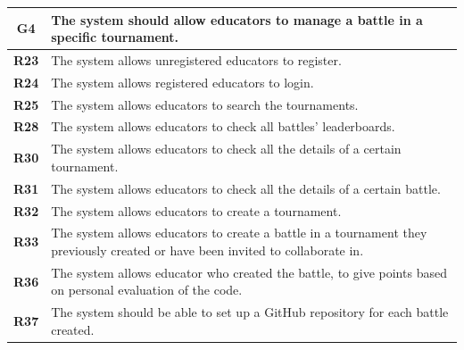 \documentclass[12pt, a4paper]{report}
\begin{document}
    \begin{table}[H]
        \begin{tabularx}{\textwidth}{cX}
        \textbf{G4}  & The system should allow educators to manage a battle in a specific tournament.                                                   \\ \hline
        \textbf{R23} & The system allows unregistered educators to register.                                                                            \\
        \textbf{R24} & The system allows registered educators to login.                                                                                 \\
        \textbf{R25} & The system allows educators to search the tournaments.                                                                           \\
        \textbf{R28} & The system allows educators to check all battles' leaderboards.                                                                  \\
        \textbf{R30} & The system allows educators to check all the details of a certain tournament.                                                    \\
        \textbf{R31} & The system allows educators to check all the details of a certain battle.                                                        \\
        \textbf{R32} & The system allows educators to create a tournament.                                                                              \\
        \textbf{R33} & The system allows educators to create a battle in a tournament they previously created or have been invited to collaborate in.   \\
        \textbf{R36} & The system allows educator who created the battle, to give points based on personal evaluation of the code.                      \\
        \textbf{R37} & The system should be able to set up a GitHub repository for each battle created.                                                 \\
        \end{tabularx}
    \end{table}
\end{document}

